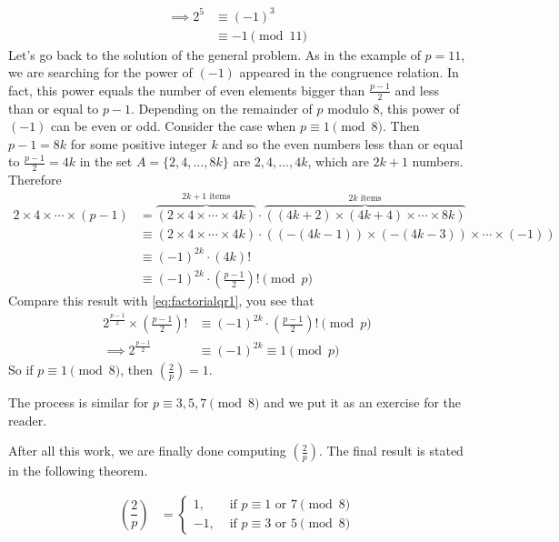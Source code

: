 \documentclass[main.tex]{subfile}
\begin{document}
\begin{solution}
\begin{align*}
		\implies 2^5
			& \equiv (-1)^3\\
			& \equiv -1 \pmod{11}
		\end{align*}
		Let's go back to the solution of the general problem. As in the example of $p=11$, we are searching for the power of $(-1)$ appeared in the congruence relation. In fact, this power equals the number of even elements bigger than $ \frac{p-1}{2}$ and less than or equal to $p-1$. Depending on the remainder of $p$ modulo $8$, this power of $(-1)$ can be even or odd. Consider the case when $p \equiv 1 \pmod 8$. Then $p-1 = 8k$ for some positive integer $k$ and so the even numbers less than or equal to $\frac{p-1}{2} = 4k$ in the set $A=\{2,4,\ldots,8k\}$ are $2,4,\ldots,4k$, which are $2k+1$ numbers. Therefore
			\begin{align*}
				2 \times 4 \times \cdots \times (p-1)
					&= \overbrace{\left(2 \times 4 \times \cdots \times 4k\right)}^{2k+1 \text{ items}} \cdot \overbrace{\left((4k+2) \times (4k+4) \times \cdots \times 8k\right)}^{2k \text{ items}}\\
					& \equiv \left(2 \times 4 \times \cdots \times 4k\right) \cdot \left((-(4k-1)) \times (-(4k-3)) \times \cdots \times (-1)\right) \\
					& \equiv (-1)^{2k} \cdot (4k)!\\
					& \equiv (-1)^{2k} \cdot \left(\frac{p-1}{2}\right)! \pmod p
			\end{align*}
		Compare this result with \eqref{eq:factorialqr1}, you see that
			\begin{align*}
				2^\frac{p-1}{2} \times \left(\frac{p-1}{2}\right)!
					& \equiv (-1)^{2k} \cdot \left(\frac{p-1}{2}\right)! \pmod p\\
				\implies 2^\frac{p-1}{2}
					& \equiv (-1)^{2k} \equiv 1 \pmod p
			\end{align*}
		So if $p \equiv 1 \pmod 8$, then $ \left(\frac{2}{p}\right)=1$.

		The process is similar for $p \equiv 3, 5, 7 \pmod 8$ and we put it as an exercise for the reader.

		After all this work, we are finally done computing $ \left(\frac{2}{p}\right)$. The final result is stated in the following theorem.

		\begin{theorem}\label{thm:2qr}
			\begin{align*}
			\left(\dfrac{2}{p}\right)
			& =
			\begin{cases}
			1,&\mbox{ if } p \equiv 1 \mbox{ or } 7\pmod 8\\
			-1,&\mbox{ if } p \equiv 3 \mbox{ or } 5\pmod 8
			\end{cases}
			\end{align*}
		\end{theorem}

	\end{solution}
\end{document}
